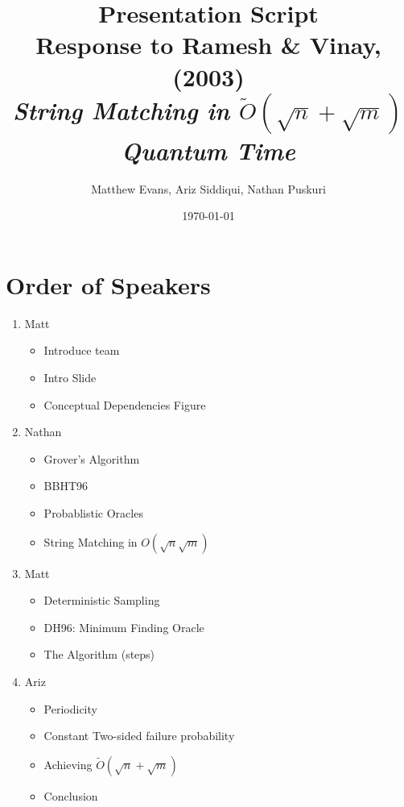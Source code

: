 \documentclass[11pt]{article}
\title{Presentation Script \\ 
\Large{Response to Ramesh \& Vinay, (2003)\\ 
\small{\textit{String Matching in \(\tilde{O}(\sqrt{n} + \sqrt{m})\) Quantum Time}} }}
\author{%
\normalsize{Matthew Evans, Ariz Siddiqui, Nathan Puskuri}
}
\date{\today}
\begin{document}
\maketitle

\section*{Order of Speakers}
\begin{enumerate}
  \item Matt
        \begin{itemize}
          \item Introduce team
          \item Intro Slide
          \item Conceptual Dependencies Figure
        \end{itemize}
  \item Nathan \begin{itemize}
          \item Grover's Algorithm
          \item BBHT96
          \item Probablistic Oracles
          \item String Matching in \(O(\sqrt{n} \sqrt{m})\)
        \end{itemize}
  \item Matt \begin{itemize}
          \item Deterministic Sampling
          \item DH96: Minimum Finding Oracle
          \item The Algorithm (steps)
        \end{itemize}
  \item Ariz \begin{itemize}
          \item Periodicity
          \item Constant Two-sided failure probability
          \item Achieving \(\tilde{O}(\sqrt{n} + \sqrt{m})\)
          \item Conclusion
        \end{itemize}
\end{enumerate}
\end{document}
